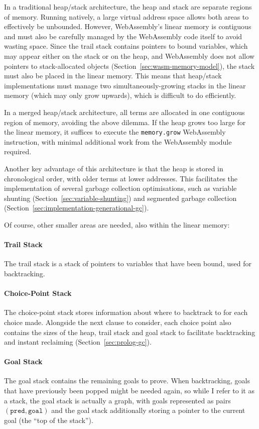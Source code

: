 In a traditional heap/stack architecture, the heap and stack are separate regions of memory. Running natively, a large virtual address space allows both areas to effectively be unbounded. However, WebAssembly's linear memory is contiguous and must also be carefully managed by the WebAssembly code itself to avoid wasting space. Since the trail stack contains pointers to bound variables, which may appear either on the stack or on the heap, and WebAssembly does not allow pointers to stack-allocated objects (Section~\ref{sec:wasm-memory-model}), the stack must also be placed in the linear memory. This means that heap/stack implementations must manage two simultaneously-growing stacks in the linear memory (which may only grow upwards), which is difficult to do efficiently.

In a merged heap/stack architecture, all terms are allocated in one contiguous region of memory, avoiding the above dilemma. If the heap grows too large for the linear memory, it suffices to execute the \texttt{memory.grow} WebAssembly instruction, with minimal additional work from the WebAssembly module required.

Another key advantage of this architecture is that the heap is stored in chronological order, with older terms at lower addresses. This facilitates the implementation of several garbage collection optimisations, such as variable shunting (Section~\ref{sec:variable-shunting}) and segmented garbage collection (Section~\ref{sec:implementation-generational-gc}).

Of course, other smaller areas are needed, also within the linear memory:

\paragraph{Trail Stack} The trail stack is a stack of pointers to variables that have been bound, used for backtracking.

\paragraph{Choice-Point Stack} The choice-point stack stores information about where to backtrack to for each choice made. Alongside the next clause to consider, each choice point also contains the sizes of the heap, trail stack and goal stack to facilitate backtracking and instant reclaiming (Section~\ref{sec:prolog-gc}).

\paragraph{Goal Stack} The goal stack contains the remaining goals to prove. When backtracking, goals that have previously been popped might be needed again, so while I refer to it as a stack, the goal stack is actually a graph, with goals represented as pairs $(\texttt{pred}, \texttt{goal})$ and the goal stack additionally storing a pointer to the current goal (the ``top of the stack'').

